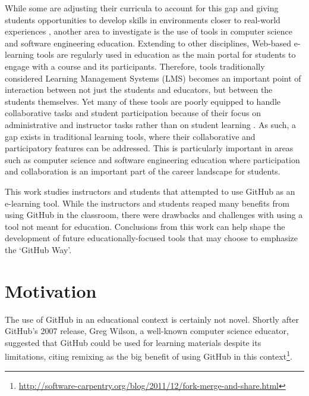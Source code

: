 While some are adjusting their curricula to account for this gap \cite{jazayeri2004education} and giving students opportunities to develop skills in environments closer to real-world experiences \cite{coleman2012collaboration}, another area to investigate is the use of tools in computer science and software engineering education. Extending to other disciplines, Web-based e-learning tools are regularly used in education as the main portal for students to engage with a course and its participants. Therefore, tools traditionally considered Learning Management Systems (LMS) becomes an important point of interaction between not just the students and educators, but between the students themselves. Yet many of these tools are poorly equipped to handle collaborative tasks and student participation because of their focus on administrative and instructor tasks rather than on student learning \cite{mcloughlin2007social}. As such, a gap exists in traditional learning tools, where their collaborative and participatory features can be addressed. This is particularly important in areas such as computer science and software engineering education where participation and collaboration is an important part of the career landscape for students.


This work studies instructors and students that attempted to use GitHub as an e-learning tool. While the instructors and students reaped many benefits from using GitHub in the classroom, there were drawbacks and challenges with using a tool not meant for education. Conclusions from this work can help shape the development of future educationally-focused tools that may choose to emphasize the `GitHub Way'.

\section{Motivation}
The use of GitHub in an educational context is certainly not novel. Shortly after GitHub's 2007 release, Greg Wilson, a well-known computer science educator, suggested that GitHub could be used for learning materials despite its limitations, citing remixing as the big benefit of using GitHub in this context\footnote{\url{http://software-carpentry.org/blog/2011/12/fork-merge-and-share.html}}.

